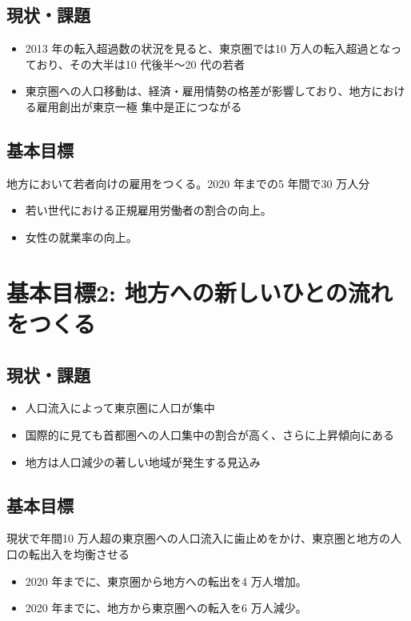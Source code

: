 \subsection {現状・課題}
\begin {itemize}
\item 2013 年の転入超過数の状況を見ると、東京圏では10 万人の転入超過となっており、その大半は10
  代後半～20 代の若者
\item 東京圏への人口移動は、経済・雇用情勢の格差が影響しており、地方における雇用創出が東京一極
  集中是正につながる
\end {itemize}

\subsection{基本目標}
地方において若者向けの雇用をつくる。2020 年までの5 年間で30 万人分
\begin {itemize}
\item 若い世代における正規雇用労働者の割合の向上。
\item 女性の就業率の向上。
\end {itemize}

\section {基本目標2: 地方への新しいひとの流れをつくる}
\subsection {現状・課題}
\begin {itemize}
\item 人口流入によって東京圏に人口が集中
\item 国際的に見ても首都圏への人口集中の割合が高く、さらに上昇傾向にある
\item 地方は人口減少の著しい地域が発生する見込み
\end {itemize}

\begin{figure}[htb]
  \begin{center}
  \end{center}
\end{figure}

\subsection {基本目標}
現状で年間10 万人超の東京圏への人口流入に歯止めをかけ、東京圏と地方の人口の転出入を均衡させる
\begin {itemize}
\item 2020 年までに、東京圏から地方への転出を4 万人増加。
\item 2020 年までに、地方から東京圏への転入を6 万人減少。
\end {itemize}

